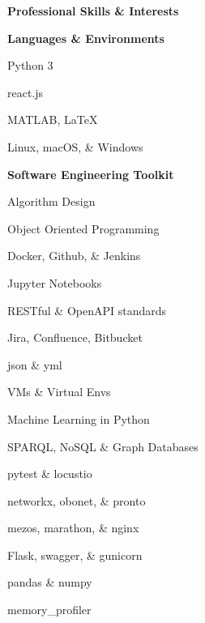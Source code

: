 \documentclass[letterpaper,final]{memoir}
\newcommand{\LargeSep}{\vspace{1.3em}}
\newcommand{\Sep}{\vspace{1.0em}}
\newcommand{\SmallSep}{\vspace{0.4em}}
\newcommand{\CVSection}[1]
	{\LARGE\textbf{#1}\par
	\SmallSep\normalsize}
\newcommand{\CVItem}[1]
	{\textbf{\color{Blue} #1}}
\begin{document}

\notoserif \CVSection{Professional Skills \& Interests}
\normalfont
\LargeSep

\CVItem{Languages \& Environments}
\Sep

\begin{multicols}{1}

    \begin{compactitem}[\color{Blue}$\circ$]

		\item Python 3
        \SmallSep
        \item react.js
        \SmallSep
        \item MATLAB, LaTeX
        \SmallSep
        \item Linux, macOS, \& Windows

	\end{compactitem}

\end{multicols}

\Sep

\CVItem{Software Engineering Toolkit}
\Sep

\begin{multicols}{2}

    \begin{compactitem}[\color{Blue}$\circ$]

        \item Algorithm Design
        \SmallSep
        \item Object Oriented Programming
        \SmallSep
        \item Docker, Github, \& Jenkins
        \SmallSep
        \item Jupyter Notebooks
        \SmallSep
        \item RESTful \& OpenAPI standards
        \SmallSep
        \item Jira, Confluence, Bitbucket
		\SmallSep
        \item json \& yml
        \SmallSep
        \item VMs \& Virtual Envs
        \SmallSep

        \item Machine Learning in Python
        \SmallSep
        \item SPARQL, NoSQL \& Graph Databases
        \SmallSep
        \item pytest \& locustio
        \SmallSep
        \item networkx, obonet, \& pronto
        \SmallSep
        \item mezos, marathon, \& nginx
        \SmallSep
        \item Flask, swagger, \& gunicorn
        \SmallSep

        \item pandas \& numpy
        \SmallSep
        \item memory\_profiler
        \SmallSep

    \end{compactitem}

\end{multicols}
\LargeSep
\end{document}
